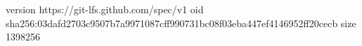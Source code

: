 version https://git-lfs.github.com/spec/v1
oid sha256:03dafd2703c9507b7a9971087cff990731bc08f03eba447ef4146952ff20cecb
size 1398256
